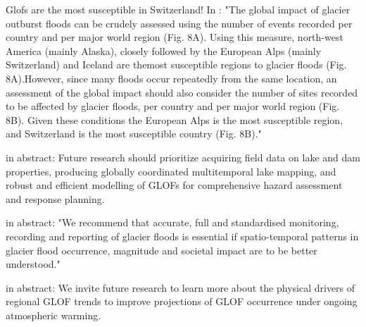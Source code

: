 Glofs are the most susceptible in Switzerland!
In \cite{Carrivick&Tweed2016}: "The global impact of glacier outburst floods can be crudely assessed
using the number of events recorded per country and per major world
region (Fig. 8A). Using this measure, north-west America (mainly Alaska),
closely followed by the European Alps (mainly Switzerland) and
Iceland are themost susceptible regions to glacier floods (Fig. 8A).However,
since many floods occur repeatedly from the same location, an assessment
of the global impact should also consider the number of sites
recorded to be affected by glacier floods, per country and per major
world region (Fig. 8B). Given these conditions the European Alps is
the most susceptible region, and Switzerland is the most susceptible
country (Fig. 8B)."




\cite{Zhang&al2024} in abstract: Future research should prioritize acquiring field data on lake and dam properties, producing globally coordinated multitemporal lake mapping, and robust and efficient modelling of GLOFs for comprehensive hazard assessment and response planning.

\cite{Carrivick&Tweed2016} in abstract: "We recommend that accurate, full and standardised monitoring, recording and reporting of glacier floods is essential if spatio-temporal patterns in glacier flood occurrence, magnitude and societal impact are to be better understood."

\cite{Veh&al2022} in abstract: We invite future research to learn more about the physical drivers of regional GLOF trends to improve projections of GLOF occurrence under ongoing atmospheric warming.



